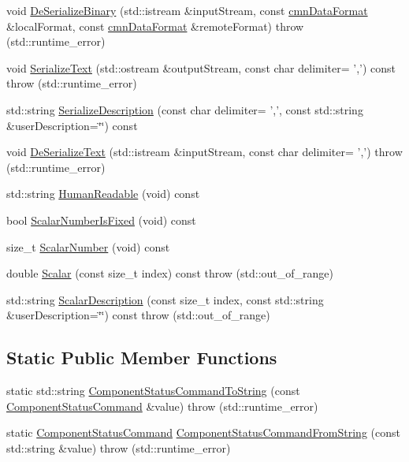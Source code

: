 \begin{DoxyCompactItemize}
void \hyperlink{classmts_component_status_control_a1f6fec491991267fcab06338df5c24ca}{De\-Serialize\-Binary} (std\-::istream \&input\-Stream, const \hyperlink{classcmn_data_format}{cmn\-Data\-Format} \&local\-Format, const \hyperlink{classcmn_data_format}{cmn\-Data\-Format} \&remote\-Format)  throw (std\-::runtime\-\_\-error)
\item 
void \hyperlink{classmts_component_status_control_a50e14690697750cdeb861c647c6df897}{Serialize\-Text} (std\-::ostream \&output\-Stream, const char delimiter= ',') const   throw (std\-::runtime\-\_\-error)
\item 
std\-::string \hyperlink{classmts_component_status_control_a97a1fa483e99f27e2f1cd22d3565ecde}{Serialize\-Description} (const char delimiter= ',', const std\-::string \&user\-Description=\char`\"{}\char`\"{}) const 
\item 
void \hyperlink{classmts_component_status_control_a8a719e3e592c8a835694636b4cb9ea55}{De\-Serialize\-Text} (std\-::istream \&input\-Stream, const char delimiter= ',')  throw (std\-::runtime\-\_\-error)
\item 
std\-::string \hyperlink{classmts_component_status_control_a33a6529d08522184d0d3437cd3d7474f}{Human\-Readable} (void) const 
\item 
bool \hyperlink{classmts_component_status_control_aeec4e2676658b289026ec5c40199d63b}{Scalar\-Number\-Is\-Fixed} (void) const 
\item 
size\-\_\-t \hyperlink{classmts_component_status_control_a4ac4075e55fd2bf991ce4f0163241241}{Scalar\-Number} (void) const 
\item 
double \hyperlink{classmts_component_status_control_afd43fdd1e243148f3921f191cdd27b80}{Scalar} (const size\-\_\-t index) const   throw (std\-::out\-\_\-of\-\_\-range)
\item 
std\-::string \hyperlink{classmts_component_status_control_a1a638843ddb5fb6e02f7f68a79724116}{Scalar\-Description} (const size\-\_\-t index, const std\-::string \&user\-Description=\char`\"{}\char`\"{}) const   throw (std\-::out\-\_\-of\-\_\-range)
\end{DoxyCompactItemize}
\subsection*{Static Public Member Functions}
\begin{DoxyCompactItemize}
\item 
static std\-::string \hyperlink{classmts_component_status_control_a09297eed54a58633297fa272e91d3c76}{Component\-Status\-Command\-To\-String} (const \hyperlink{classmts_component_status_control_aaa1cc592d13ddd45a5cf695f72d3511f}{Component\-Status\-Command} \&value)  throw (std\-::runtime\-\_\-error)
\item 
static \hyperlink{classmts_component_status_control_aaa1cc592d13ddd45a5cf695f72d3511f}{Component\-Status\-Command} \hyperlink{classmts_component_status_control_ae1f43cb364e4c30acf69b456ba5d2bb2}{Component\-Status\-Command\-From\-String} (const std\-::string \&value)  throw (std\-::runtime\-\_\-error)
\end{DoxyCompactItemize}
